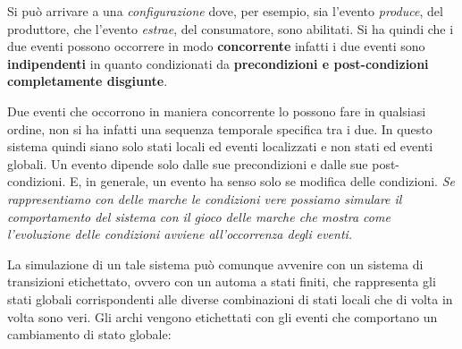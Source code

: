 \begin{esempio}
\begin{center}
  \end{center}
  Si può arrivare a una \textit{configurazione} dove, per esempio, sia l'evento
  \textit{produce}, del produttore, che l'evento \textit{estrae}, del
  consumatore, sono abilitati. Si ha quindi che i due eventi possono occorrere
  in modo \textbf{concorrente} infatti i due eventi sono \textbf{indipendenti}
  in quanto condizionati da \textbf{precondizioni e post-condizioni completamente
    disgiunte}. 
    \begin{nota}
    Due eventi che occorrono in maniera concorrente lo possono fare in
  qualsiasi ordine, non si ha infatti una sequenza temporale specifica tra i
  due. 
  In questo sistema quindi siano solo stati locali ed eventi localizzati e non
  stati ed eventi globali. Un evento dipende solo dalle sue precondizioni e
  dalle sue post-condizioni. E, in generale, un evento ha senso solo se modifica delle condizioni. \textit{Se rappresentiamo con delle marche le condizioni vere possiamo
    simulare il comportamento del sistema con il \textit{gioco delle marche} che
    mostra come l'evoluzione delle condizioni avviene all'occorrenza degli
    eventi.}     \end{nota}

  La simulazione di un tale sistema può comunque avvenire con un sistema di
  transizioni etichettato, ovvero con un automa a stati finiti, che rappresenta
  gli stati globali corrispondenti alle diverse combinazioni di stati locali che
  di volta in volta sono veri.
  \newpage
  Gli archi vengono etichettati con gli eventi che
  comportano un cambiamento di stato globale:
 \begin{center}
\end{center}
\end{esempio}
